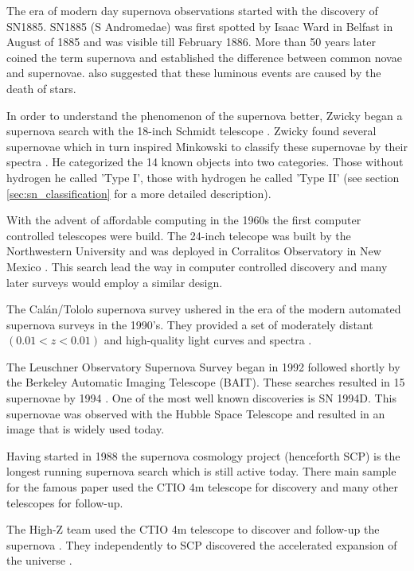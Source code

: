 The era of modern day supernova observations started with the discovery of SN1885. SN1885 (S Andromedae) was first spotted by Isaac Ward in Belfast in August of 1885 \citep{1885AN....112..360H} and was visible till February 1886. 
More than 50 years later \citet{1934PNAS...20..254B} coined the term supernova and established the difference between common novae and supernovae. \citet{1934PNAS...20..254B} also suggested that these luminous events are caused by the death of stars. 

In order to understand the phenomenon of the supernova better, Zwicky began a supernova search with the 18-inch Schmidt telescope . Zwicky found several supernovae which in turn inspired Minkowski to classify these supernovae by their spectra \citet{1941PASP...53..224M}. 
He categorized the 14 known objects into two categories. Those without hydrogen he called 'Type I', those with hydrogen he called 'Type II' (see section \ref{sec:sn_classification} for a more detailed description).

With the advent of affordable computing in the 1960s the first computer controlled telescopes were build. The 24-inch telecope was built by the Northwestern University and was deployed in Corralitos Observatory in New Mexico \cite{1975PASP...87..565C}. This search lead the way in computer controlled discovery and many later surveys would employ a similar design.

The Cal\'{a}n/Tololo supernova survey \citep{1993AJ....106.2392H} ushered in the era of the modern automated supernova surveys in the 1990's. They provided a set of moderately distant $(0.01 < z < 0.01)$ \sneia and \sneii high-quality light curves and spectra .

The Leuschner Observatory Supernova Survey began in 1992 followed shortly by the Berkeley Automatic Imaging Telescope (BAIT). These searches resulted in 15 supernovae by 1994 \citep{1994AAS...185.7905V}. One of the most well known discoveries is SN 1994D. This supernovae was observed with the Hubble Space Telescope and resulted in an image that is widely used today.

Having started in 1988 the supernova cosmology project (henceforth SCP) is the longest running supernova search which is still active today. There main sample for the famous paper \citep{1999ApJ...517..565P} used the CTIO 4m telescope for discovery and many other telescopes for follow-up.

The High-Z team used the CTIO 4m telescope to discover and follow-up the supernova \citep{1998ApJ...507...46S}. They independently to SCP discovered the accelerated expansion of the universe \citep{1998AJ....116.1009R}.


